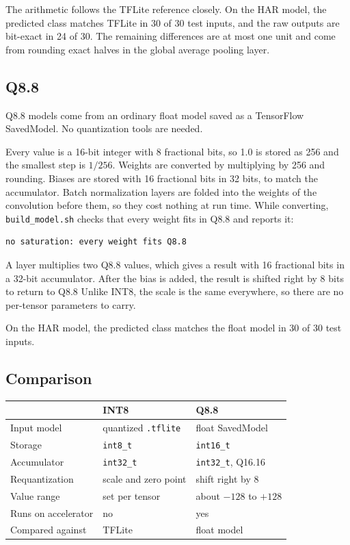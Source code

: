 \documentclass[11pt,a4paper]{article}
\begin{document}
The arithmetic follows the TFLite reference closely. On the HAR model, the predicted class matches TFLite in 30 of 30 test inputs, and the raw outputs are bit-exact in 24 of 30. The remaining differences are at most one unit and come from rounding exact halves in the global average pooling layer.

\subsection{Q8.8}

Q8.8 models come from an  ordinary float model saved as a TensorFlow SavedModel. No quantization tools are needed.

Every value is a 16-bit integer with 8 fractional bits, so 1.0 is stored as 256 and the smallest step is $1/256$. Weights are converted by multiplying by 256 and rounding. Biases are stored with 16 fractional bits in 32 bits, to match the accumulator. Batch normalization layers are folded into the weights of the convolution before them, so they cost nothing at run time. While converting, \texttt{build\_model.sh} checks that every weight fits in Q8.8 and reports it:

\begin{lstlisting}
no saturation: every weight fits Q8.8
\end{lstlisting}

A layer multiplies two Q8.8 values, which gives a result with 16 fractional bits in a 32-bit accumulator. After the bias is added, the result is shifted right by 8 bits to return to Q8.8 Unlike INT8, the scale is the same everywhere, so there are no per-tensor parameters to carry.

On the HAR model, the predicted class matches the float model in 30 of 30 test inputs.

\subsection{Comparison}

\begin{center}
\begin{tabular}{lll}
\toprule
 & INT8 & Q8.8 \\
\midrule
Input model          & quantized \texttt{.tflite}  & float SavedModel \\
Storage              & \texttt{int8\_t}            & \texttt{int16\_t} \\
Accumulator          & \texttt{int32\_t}           & \texttt{int32\_t}, Q16.16 \\
Requantization       & scale and zero point        & shift right by 8 \\
Value range          & set per tensor              & about $-128$ to $+128$ \\
Runs on accelerator  & no                          & yes \\
Compared against     & TFLite                      & float model \\
\bottomrule
\end{tabular}
\end{center}
\end{document}
